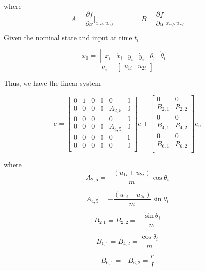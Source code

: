 \noindent where
\[ A =  \frac{\partial f}{\partial x} \Bigg|_{x_{ref}, u_{ref}}
\quad\quad\quad\quad
B = \frac{\partial f}{\partial u} \Bigg|_{x_{ref}, u_{ref}} \]

\noindent Given the nominal state and input at time $t_i$

\[ x_{0} = \begin{bmatrix}
    x_i & \dot{x}_i & y_i & \dot{y}_i & \theta_i & \dot{\theta}_i
\end{bmatrix} \]
\[ u_i = \begin{bmatrix}
    u_{1i} & u_{2i}
\end{bmatrix} \]

\noindent Thus, we have the linear system

\[ \dot{e} = \begin{bmatrix}
    0 & 1 & 0 & 0 & 0 & 0 \\
    0 & 0 & 0 & 0 & A_{2,5} & 0 \\
    0 & 0 & 0 & 1 & 0 & 0 \\
    0 & 0 & 0 & 0 & A_{4,5} & 0 \\
    0 & 0 & 0 & 0 & 0 & 1 \\
    0 & 0 & 0 & 0 & 0 & 0 \\
\end{bmatrix} e +
\begin{bmatrix}
    0 & 0 \\
    B_{2,1} & B_{2,2} \\
    0 & 0 \\
    B_{4,1} & B_{4,2} \\
    0 & 0 \\
    B_{6,1} & B_{6,2} \\
\end{bmatrix} e_u\]

\noindent where
\[ A_{2,5} = -\frac{(u_{1i} + u_{2i})}{m}\cos \theta_i \]

\[ A_{4,5} = -\frac{(u_{1i} + u_{2i})}{m}\sin \theta_i \]

\[ B_{2,1} = B_{2,2} = -\frac{\sin \theta_i}{m} \]

\[ B_{4,1} = B_{4,2} = \frac{\cos\theta_i}{m} \]

\[ B_{6,1} = -B_{6,2} = \frac{r}{I} \]
